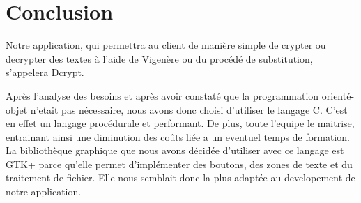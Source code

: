 \documentclass[a4]{article}
\begin{document}
			\section{Conclusion}
			Notre application, qui permettra au client de manière simple de crypter ou decrypter des textes
			à l'aide de Vigenère ou du procédé de substitution, s'appelera Dcrypt. 
			
			
			 Après l'analyse des besoins et après avoir constaté que la programmation orienté-objet n'etait pas nécessaire, nous avons donc choisi d'utiliser le langage C.
			C'est en effet un langage procédurale et performant.
			De plus, toute l'equipe le maitrise, entrainant ainsi une diminution des coûts liée a un eventuel temps de formation.
			La bibliothèque graphique que nous avons décidée d'utiliser avec ce langage est GTK+ parce qu'elle permet d'implémenter des boutons, des zones de texte et du traitement de fichier.
			Elle nous semblait donc la plus adaptée au developement de notre application.
			 
			
\end{document}
